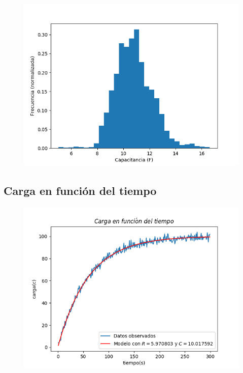 \documentclass[12pt,letterpaper]{article}
\begin{document}
\begin{figure}[H]
\includegraphics{c_hist.png}
\centering
\end{figure}

\subsection*{Carga en función del tiempo}
\begin{figure}[H]
\includegraphics{carga.png}
\centering
\end{figure}

\vspace{0.3cm}
\end{document}
